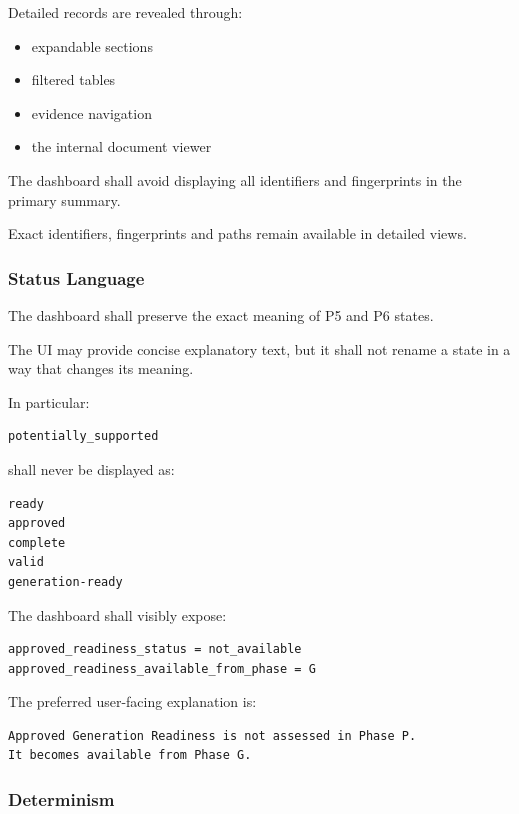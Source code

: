 Detailed records are revealed through:

\begin{itemize}
\tightlist
\item
  expandable sections
\item
  filtered tables
\item
  evidence navigation
\item
  the internal document viewer
\end{itemize}

The dashboard shall avoid displaying all identifiers and fingerprints in the primary summary.

Exact identifiers, fingerprints and paths remain available in detailed views.

\hypertarget{status-language}{%
\subsubsection{Status Language}\label{status-language}}

The dashboard shall preserve the exact meaning of P5 and P6 states.

The UI may provide concise explanatory text, but it shall not rename a state in a way that changes its meaning.

In particular:

\begin{verbatim}
potentially_supported
\end{verbatim}

shall never be displayed as:

\begin{verbatim}
ready
approved
complete
valid
generation-ready
\end{verbatim}

The dashboard shall visibly expose:

\begin{verbatim}
approved_readiness_status = not_available
approved_readiness_available_from_phase = G
\end{verbatim}

The preferred user-facing explanation is:

\begin{verbatim}
Approved Generation Readiness is not assessed in Phase P.
It becomes available from Phase G.
\end{verbatim}

\hypertarget{determinism}{%
\subsubsection{Determinism}\label{determinism}}

